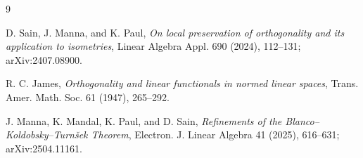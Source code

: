 \documentclass[11pt]{article}
\theoremstyle{definition}
\theoremstyle{remark}
\begin{document}
\begin{thebibliography}{9}

D. Sain, J. Manna, and K. Paul,
\emph{On local preservation of orthogonality and its application to
isometries}, Linear Algebra Appl. 690 (2024), 112--131;
arXiv:2407.08900.

R. C. James,
\emph{Orthogonality and linear functionals in normed linear spaces},
Trans. Amer. Math. Soc. 61 (1947), 265--292.

J. Manna, K. Mandal, K. Paul, and D. Sain,
\emph{Refinements of the Blanco--Koldobsky--Turn\v{s}ek Theorem},
Electron. J. Linear Algebra 41 (2025), 616--631;
arXiv:2504.11161.

\end{thebibliography}
\end{document}
